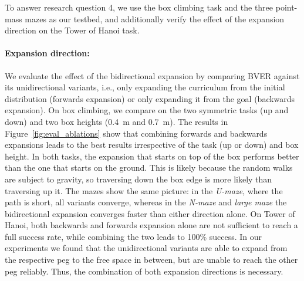To answer research question 4, we use the box climbing task and the three point-mass mazes as our testbed, and additionally verify the effect of the expansion direction on the Tower of Hanoi task.

\paragraph{Expansion direction:}
We evaluate the effect of the bidirectional expansion by comparing BVER against its unidirectional variants, i.e., only expanding the curriculum from the initial distribution (forwards expansion) or only expanding it from the goal (backwards expansion). On box climbing, we compare on the two symmetric tasks (up and down) and two box heights (\SI{0.4}{\meter} and \SI{0.7}{\meter}). The results in Figure~\ref{fig:eval_ablations} show that combining forwards and backwards expansions leads to the best results irrespective of the task (up or down) and box height. In both tasks, the expansion that starts on top of the box performs better than the one that starts on the ground. This is likely because the random walks are subject to gravity, so traversing down the box edge is more likely than traversing up it. The mazes show the same picture: in the \textit{U-maze}, where the path is short, all variants converge, whereas in the \textit{N-maze} and \textit{large maze} the bidirectional expansion converges faster than either direction alone. On Tower of Hanoi, both backwards and forwards expansion alone are not sufficient to reach a full success rate, while combining the two leads to 100\% success. In our experiments we found that the unidirectional variants are able to expand from the respective peg to the free space in between, but are unable to reach the other peg reliably. Thus, the combination of both expansion directions is necessary.
